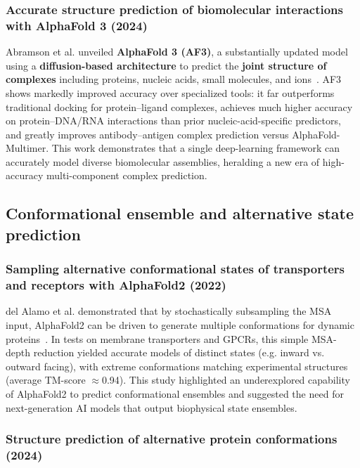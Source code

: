 \subsubsection{Accurate structure prediction of biomolecular interactions with AlphaFold 3 (2024)}

Abramson et al.
unveiled \textbf{AlphaFold 3 (AF3)}, a substantially updated model using a \textbf{diffusion-based architecture} to predict the \textbf{joint structure of complexes} including proteins, nucleic acids, small molecules, and ions~\cite{alphafold3}.
AF3 shows markedly improved accuracy over specialized tools: it far outperforms traditional docking for protein–ligand complexes, achieves much higher accuracy on protein–DNA/RNA interactions than prior nucleic-acid-specific predictors, and greatly improves antibody–antigen complex prediction versus AlphaFold-Multimer.
This work demonstrates that a single deep-learning framework can accurately model diverse biomolecular assemblies, heralding a new era of high-accuracy multi-component complex prediction.

\subsection{Conformational ensemble and alternative state prediction}

\subsubsection{Sampling alternative conformational states of transporters and receptors with AlphaFold2 (2022)}

del Alamo et al.
demonstrated that by stochastically subsampling the MSA input, AlphaFold2 can be driven to generate multiple conformations for dynamic proteins~\cite{delAlamo2022AlternativeStates}.
In tests on membrane transporters and GPCRs, this simple MSA-depth reduction yielded accurate models of distinct states (e.g. inward vs.
outward facing), with extreme conformations matching experimental structures (average TM-score $\approx$0.94).
This study highlighted an underexplored capability of AlphaFold2 to predict conformational ensembles and suggested the need for next-generation AI models that output biophysical state ensembles.

\subsubsection{Structure prediction of alternative protein conformations (2024)}

